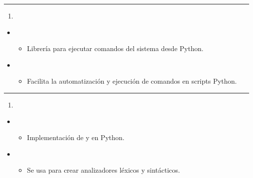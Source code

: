 \documentclass[a4paper,10pt,oneside,spanish,openany]{sphinxmanual}
\begin{document}
\bigskip\hrule\bigskip

\begin{enumerate}
%
\setcounter{enumi}{16}
\item {} 
\sphinxAtStartPar
{}

\end{enumerate}
\begin{itemize}
\item {} 
\sphinxAtStartPar
{}
\begin{itemize}
\item {} 
\sphinxAtStartPar
Librería para ejecutar comandos del sistema desde Python.

\end{itemize}

\item {} 
\sphinxAtStartPar
{}
\begin{itemize}
\item {} 
\sphinxAtStartPar
Facilita la automatización y ejecución de comandos en scripts Python.

\end{itemize}

\end{itemize}


\bigskip\hrule\bigskip

\begin{enumerate}
%
\setcounter{enumi}{17}
\item {} 
\sphinxAtStartPar
{}

\end{enumerate}
\begin{itemize}
\item {} 
\sphinxAtStartPar
{}
\begin{itemize}
\item {} 
\sphinxAtStartPar
Implementación de  y  en Python.

\end{itemize}

\item {} 
\sphinxAtStartPar
{}
\begin{itemize}
\item {} 
\sphinxAtStartPar
Se usa para crear analizadores léxicos y sintácticos.

\end{itemize}

\end{itemize}
\end{document}
